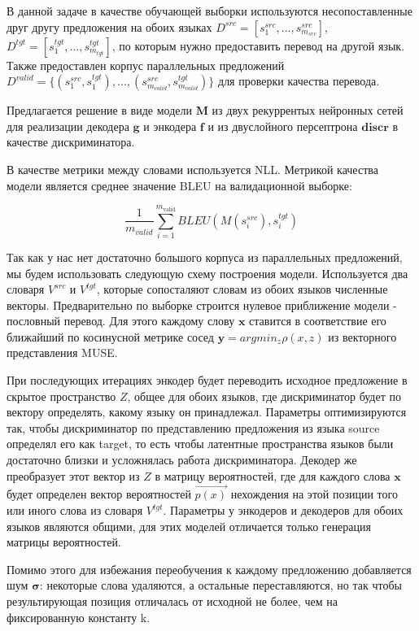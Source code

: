 \documentclass[12pt,twoside]{article}
\begin{document}
В данной задаче в качестве обучающей выборки используются несопоставленные друг другу предложения на обоих языках $D^{src} = [s_1^{src},...,s_{m_{src}}^{src}]$, $D^{tgt} = [s_1^{tgt},...,s_{m_{tgt}}^{tgt}]$, по которым нужно предоставить перевод на другой язык. Также предоставлен корпус параллельных предложений $D^{valid} = \{(s_1^{src},s_1^{tgt}),...,(s_{m_{valid}}^{src},s_{m_{valid}}^{tgt})\}$ для проверки качества перевода.


Предлагается решение в виде модели $\mathbf{M}$ из двух рекуррентых нейронных сетей для реализации декодера $\mathbf{g}$ и энкодера $\mathbf{f}$ и из двуслойного персептрона $\mathbf{discr}$ в качестве дискриминатора. 

В качестве метрики между словами используется NLL. Метрикой качества модели является среднее значение BLEU на валидационной выборке:

$$\dfrac{1}{m_{valid}}\sum_{i=1}^{m_\text{valid}}BLEU(M(s_i^{src}),s_i^{tgt})$$

Так как у нас нет достаточно большого корпуса из параллельных предложений, мы будем использовать следующую схему построения модели. Используется два словаря $V^{src}$ и $V^{tgt}$, которые сопосталяют словам из обоих языков численные векторы. Предварительно по выборке строится нулевое приближение модели - пословный перевод. Для этого каждому слову $\mathbf{x}$ ставится в соответствие его ближайший по косинусной метрике сосед  $\mathbf{y} = argmin_{z}\rho(x,z)$ из векторного представления MUSE.

 При последующих итерациях энкодер будет переводить исходное предложение в скрытое пространство $Z$, общее для обоих языков, где дискриминатор будет по вектору определять, какому языку он принадлежал. Параметры оптимизируются так, чтобы дискриминатор по представлению предложения из языка source определял его как target, то есть чтобы латентные пространства языков были достаточно близки и усложнялась работа дискриминатора. Декодер же преобразует этот вектор из $Z$ в матрицу вероятностей, где для каждого слова $\mathbf{x}$ будет определен вектор вероятностей $\vec{p(x)}$ нехождения на этой позиции того или иного слова из словаря $V^{tgt}$. Параметры у энкодеров и декодеров для обоих языков являются общими, для этих моделей отличается только генерация матрицы вероятностей. 

Помимо этого для избежания переобучения к каждому предложению добавляется шум $\mathbf{\sigma}$: некоторые слова удаляются, а остальные переставляются, но так чтобы результирующая позиция отличалась от исходной не более, чем на фиксированную константу k.
\end{document}
